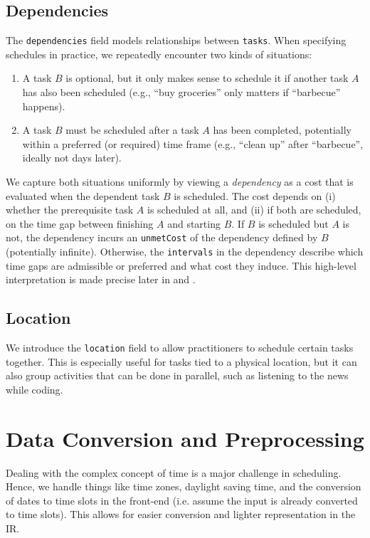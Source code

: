 \subsection*{Dependencies}
\label{subsubsec:methodology-language-design:dependencies}
The \texttt{dependencies} field models relationships between \texttt{tasks}. When specifying schedules in practice, we repeatedly encounter two kinds of situations:
\begin{enumerate}
    \item A task $B$ is optional, but it only makes sense to schedule it if another task $A$ has also been scheduled (e.g., ``buy groceries'' only matters if ``barbecue'' happens).
    \item A task $B$ must be scheduled after a task $A$ has been completed, potentially within a preferred (or required) time frame (e.g., ``clean up'' after ``barbecue'', ideally not days later).
\end{enumerate}
We capture both situations uniformly by viewing a \emph{dependency} as a cost that is evaluated when the dependent task $B$ is scheduled. The cost depends on (i) whether the prerequisite task $A$ is scheduled at all, and (ii) if both are scheduled, on the time gap between finishing $A$ and starting $B$. If $B$ is scheduled but $A$ is not, the dependency incurs an \texttt{unmetCost} of the dependency defined by $B$ (potentially infinite). Otherwise, the \texttt{intervals} in the dependency describe which time gaps are admissible or preferred and what cost they induce. This high-level interpretation is made precise later in  and .

\subsection*{Location}
We introduce the \texttt{location} field to allow practitioners to schedule certain tasks together. This is especially useful for tasks tied to a physical location, but it can also group activities that can be done in parallel, such as listening to the news while coding.

\section{Data Conversion and Preprocessing}
Dealing with the complex concept of time is a major challenge in scheduling. Hence, we handle things like time zones, daylight saving time, and the conversion of dates to time slots in the front-end (i.e. assume the input is already converted to time slots). This allows for easier conversion and lighter representation in the \ac{IR}.

